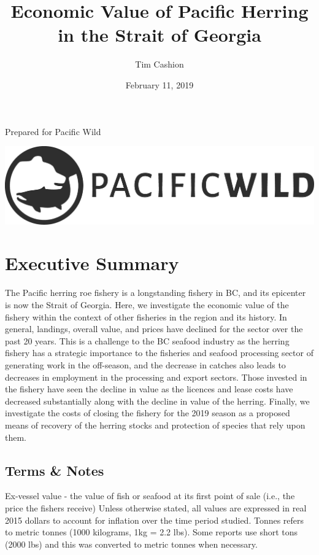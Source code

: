 \documentclass[]{article}
\title{Economic Value of Pacific Herring in the Strait of Georgia}
\author{Tim Cashion}
\date{February 11, 2019}
\theoremstyle{definition}
\theoremstyle{definition}
\theoremstyle{definition}
\theoremstyle{remark}
\begin{document}
\maketitle

{
\setcounter{tocdepth}{2}
\tableofcontents
}
Prepared for Pacific Wild

\begin{center}\includegraphics[width=18.9in]{./PW Logo files/PNG (raster)/large-png-pacific-wild-logo/pw-logo-dark-transparent-bg@2x} \end{center}

\section{Executive Summary}\label{executive-summary}

The Pacific herring roe fishery is a longstanding fishery in BC, and its
epicenter is now the Strait of Georgia. Here, we investigate the
economic value of the fishery within the context of other fisheries in
the region and its history. In general, landings, overall value, and
prices have declined for the sector over the past 20 years. This is a
challenge to the BC seafood industry as the herring fishery has a
strategic importance to the fisheries and seafood processing sector of
generating work in the off-season, and the decrease in catches also
leads to decreases in employment in the processing and export sectors.
Those invested in the fishery have seen the decline in value as the
licences and lease costs have decreased substantially along with the
decline in value of the herring. Finally, we investigate the costs of
closing the fishery for the 2019 season as a proposed means of recovery
of the herring stocks and protection of species that rely upon them.

\subsection{Terms \& Notes}\label{terms-notes}

Ex-vessel value - the value of fish or seafood at its first point of
sale (i.e., the price the fishers receive) Unless otherwise stated, all
values are expressed in real 2015 dollars to account for inflation over
the time period studied. Tonnes refers to metric tonnes (1000 kilograms,
1kg = 2.2 lbs). Some reports use short tons (2000 lbs) and this was
converted to metric tonnes when necessary.
\end{document}
